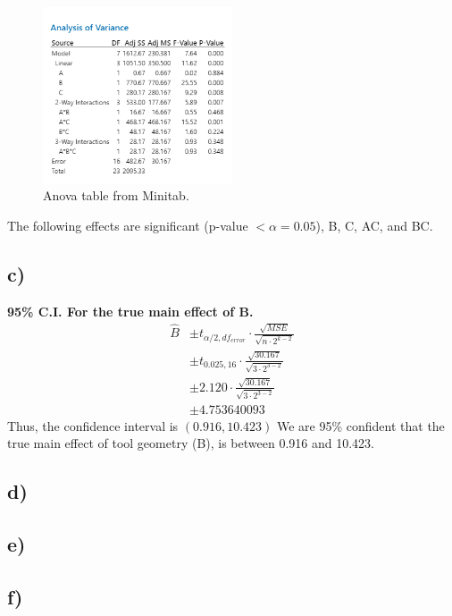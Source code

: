 \documentclass{article}
\begin{document}
\begin{figure}[h]
    \centering
    \includegraphics[width=0.5\textwidth]{./images/1_b.png}
    \caption{Anova table from Minitab.}
    \label{fig:3_b_2}
\end{figure}

The following effects are significant (p-value $< \alpha = 0.05$), B, C, AC, and BC.

\subsection*{c)}
\textbf{95\% C.I. For the true main effect of B.} \\
\begin{align*}
    \hat{B} &\pm t_{\alpha/2, df_{error}} \cdot \frac{\sqrt{MSE}}{\sqrt{n \cdot 2^{k-2}}} \\
            &\pm t_{0.025, 16} \cdot \frac{\sqrt{30.167}}{\sqrt{3 \cdot 2^{3-2}}} \\
            &\pm 2.120 \cdot \frac{\sqrt{30.167}}{\sqrt{3 \cdot 2^{3-2}}} \\
            &\pm 4.753640093
\end{align*}
Thus, the confidence interval is $(0.916, 10.423)$
We are 95\% confident that the true main effect of tool geometry (B), is between 0.916 and 10.423.
\subsection*{d)}
\subsection*{e)}
\subsection*{f)}

\clearpage
\end{document}
